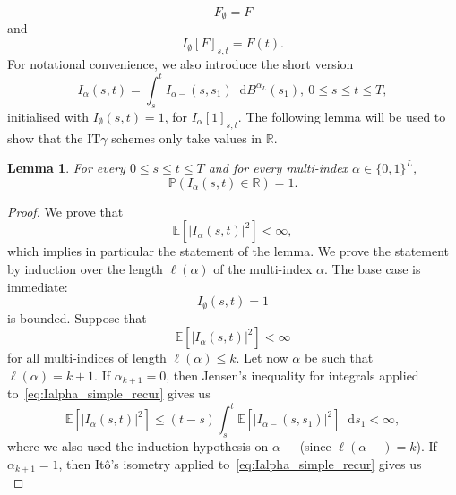 \documentclass[11pt]{amsart}
\newtheorem{lemma}[theorem]{Lemma}
\newcommand{\E}{{\mathbb E}}
\newcommand{\PP}{{\mathbb P}}
\newcommand*\diff{\mathop{}\!\mathrm{d}}
\newcommand{\IT}{\textrm{IT}}
\begin{document}
{\begin{equation*}
F_{\emptyset} = F
\end{equation*}
and
\begin{equation*}
I_{\emptyset} [F]_{s,t} = F(t).
\end{equation*}
For notational convenience, we also introduce the short version
\begin{equation}\label{eq:Ialpha_simple_recur}
I_{\alpha}(s,t) = \int_{s}^{t} I_{\alpha-}(s,s_{1}) \diff B^{\alpha_{L}}(s_{1}),\ 0 \leq s \leq t \leq T,
\end{equation}
initialised with $I_{\emptyset}(s,t) = 1$, for $I_{\alpha}[1]_{s,t}$. The following lemma will be used to show that the $\IT \gamma$ schemes only take values in $\mathbb{R}$.
\begin{lemma}\label{lem:Ialpha_bounded}
For every $0 \leq s \leq t \leq T$ and for every multi-index $\alpha \in \{ 0,1 \}^{L}$,
\begin{equation*}
\PP (I_{\alpha}(s,t) \in \mathbb{R}) = 1.
\end{equation*}
\end{lemma}
\begin{proof}
We prove that
\begin{equation*}
\E \left[ \left| I_{\alpha}(s,t) \right|^{2} \right] < \infty,
\end{equation*}
which implies in particular the statement of the lemma. We prove the statement by induction over the length $\ell(\alpha)$ of the multi-index $\alpha$. The base case is immediate:
\begin{equation*}
I_{\emptyset}(s,t) = 1
\end{equation*}
is bounded. Suppose that
\begin{equation*}
\E \left[ \left| I_{\alpha}(s,t) \right|^{2} \right] < \infty
\end{equation*}
for all multi-indices of length $\ell(\alpha) \leq k$. Let now $\alpha$ be such that $\ell(\alpha) = k+1$. If $\alpha_{k+1} = 0$, then Jensen's inequality for integrals applied to~\eqref{eq:Ialpha_simple_recur} gives us
\begin{equation*}
\E \left[ \left| I_{\alpha}(s,t) \right|^{2} \right] \leq (t-s) \int_{s}^{t} \E \left[ \left| I_{\alpha-}(s,s_{1}) \right|^{2} \right] \diff s_{1} < \infty,
\end{equation*}
where we also used the induction hypothesis on $\alpha-$ (since $\ell(\alpha-) = k$). If $\alpha_{k+1}=1$, then Itô's isometry applied to~\eqref{eq:Ialpha_simple_recur} gives us
\begin{equation*}

\end{equation*}
\end{proof}}
\end{document}
